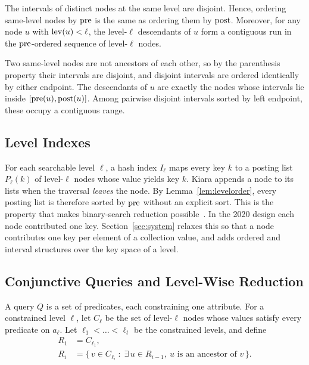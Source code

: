 \begin{lemma}
\label{lem:levelorder}
The intervals of distinct nodes at the same level are disjoint. Hence, ordering same-level nodes by $\mathrm{pre}$ is the same as ordering them by $\mathrm{post}$. Moreover, for any node $u$ with $\mathrm{lev}(u)<\ell$, the level-$\ell$ descendants of $u$ form a contiguous run in the $\mathrm{pre}$-ordered sequence of level-$\ell$ nodes.
\end{lemma}
\begin{IEEEproof}
Two same-level nodes are not ancestors of each other, so by the parenthesis property their intervals are disjoint, and disjoint intervals are ordered identically by either endpoint. The descendants of $u$ are exactly the nodes whose intervals lie inside $[\mathrm{pre}(u),\mathrm{post}(u)]$. Among pairwise disjoint intervals sorted by left endpoint, these occupy a contiguous range.
\end{IEEEproof}

\subsection{Level Indexes}
For each searchable level $\ell$, a hash index $I_\ell$ maps every key $k$ to a posting list $P_\ell(k)$ of level-$\ell$ nodes whose value yields key $k$. Kiara appends a node to its lists when the traversal \emph{leaves} the node. By Lemma~\ref{lem:levelorder}, every posting list is therefore sorted by $\mathrm{pre}$ without an explicit sort. This is the property that makes binary-search reduction possible~\cite{kapoor2020efficient}. In the 2020 design each node contributed one key. Section~\ref{sec:system} relaxes this so that a node contributes one key per element of a collection value, and adds ordered and interval structures over the key space of a level.

\subsection{Conjunctive Queries and Level-Wise Reduction}
A query $Q$ is a set of predicates, each constraining one attribute. For a constrained level $\ell$, let $C_\ell$ be the set of level-$\ell$ nodes whose values satisfy every predicate on $a_\ell$. Let $\ell_1<\dots<\ell_t$ be the constrained levels, and define
\begin{align}
R_1 &= C_{\ell_1}, \nonumber\\
R_i &= \{\, v\in C_{\ell_i} \;:\; \exists\, u\in R_{i-1},\ u \text{ is an ancestor of } v \,\}. \label{eq:reduction}
\end{align}

